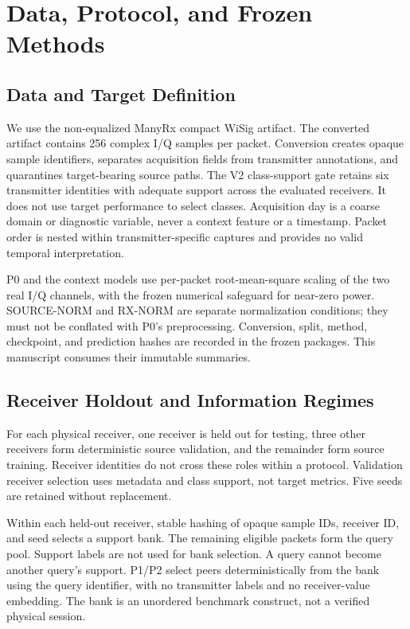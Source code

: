\section{Data, Protocol, and Frozen Methods}
\subsection{Data and Target Definition}
We use the non-equalized ManyRx compact WiSig artifact. The converted artifact contains 256 complex I/Q samples per packet. Conversion creates opaque sample identifiers, separates acquisition fields from transmitter annotations, and quarantines target-bearing source paths. The V2 class-support gate retains six transmitter identities with adequate support across the evaluated receivers. It does not use target performance to select classes. Acquisition day is a coarse domain or diagnostic variable, never a context feature or a timestamp. Packet order is nested within transmitter-specific captures and provides no valid temporal interpretation.

P0 and the context models use per-packet root-mean-square scaling of the two real I/Q channels, with the frozen numerical safeguard for near-zero power. SOURCE-NORM and RX-NORM are separate normalization conditions; they must not be conflated with P0's preprocessing. Conversion, split, method, checkpoint, and prediction hashes are recorded in the frozen packages. This manuscript consumes their immutable summaries.


\subsection{Receiver Holdout and Information Regimes}
For each physical receiver, one receiver is held out for testing, three other receivers form deterministic source validation, and the remainder form source training. Receiver identities do not cross these roles within a protocol. Validation receiver selection uses metadata and class support, not target metrics. Five seeds are retained without replacement.

Within each held-out receiver, stable hashing of opaque sample IDs, receiver ID, and seed selects a support bank. The remaining eligible packets form the query pool. Support labels are not used for bank selection. A query cannot become another query's support. P1/P2 select peers deterministically from the bank using the query identifier, with no transmitter labels and no receiver-value embedding. The bank is an unordered benchmark construct, not a verified physical session.

